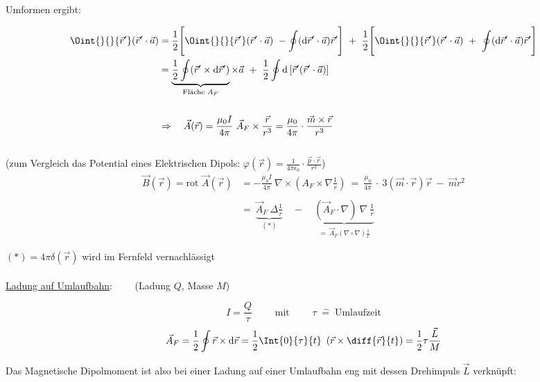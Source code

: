 Umformen ergibt:

\begin{align*}
\Oint{}{}{\vec{r}'} (\vec{r}'\cdot\vec{a}) &= \frac{1}{2}\Bigg[\Oint{}{}{\vec{r}'}(\vec{r}'\cdot\vec{a}) \ - \oint(\mathrm{d}\vec{r}'\cdot\vec{a})\vec{r}'\Bigg] \ + \ \frac{1}{2} \Bigg[\Oint{}{}{\vec{r}'}(\vec{r}'\cdot\vec{a}) \ + \ \oint(\mathrm{d}\vec{r}'\cdot\vec{a})\vec{r}'\Bigg]\\
&= \underbrace{\frac{1}{2}\oint(\vec{r}'\times\mathrm{d}\vec{r}')}_{\text{Fläche }A_F} \times\vec{a} \ + \ \frac{1}{2} \oint\mathrm{d}\left[\vec{r}'(\vec{r}'\cdot\vec{a})\right]\\ 
\ \\
& \Rightarrow \quad \vec{A}(\vec{r}) = \frac{\mu_0 I }{4\pi} \; \vec{A}_F\times\frac{\vec{r}}{r^3} = \frac{\mu_0}{4\pi} \cdot \frac{\vec{m}\times\vec{r}}{r^3}
\end{align*}
\ \\
(zum Vergleich das Potential eines Elektrischen Dipols: $\varphi(\vec{r}) = \frac{1}{4\pi\epsilon_0} \cdot \frac{\vec{p}\cdot\vec{r}}{r^3}$)
\ \\
\begin{align*}
\vec{B}(\vec{r}) = \text{rot } \vec{A}(\vec{r}) &= - \frac{\mu_0 I}{4\pi} \ \nabla \times \left(A_F\times\nabla\frac{1}{r}\right) \ = \ \frac{\mu_0}{4\pi} \ \cdot \ 3(\vec{m}\cdot\vec{r})\vec{r} \ - \ \vec{m}r^2\\
\ \\
&= \ \underbrace{\vec{A}_F \ \Delta\frac{1}{r}}_{(*)} \quad - \quad \underbrace{(\vec{A}_F
\cdot\nabla)\ \nabla \ \frac{1}{r}}_{= \ \vec{A}_F (\nabla \circ \nabla) \frac{1}{r}}
\end{align*}

$(*) = 4\pi\delta(\vec{r})$ wird im Fernfeld vernachlässigt
\ \\
\ \\
\underline{Ladung auf Umlaufbahn}:$\qquad$ (Ladung $Q$, Masse $M$)

\begin{equation*}
I = \frac{Q}{\tau} \qquad \text{ mit } \qquad \tau \; \hat{=} \; \text{Umlaufzeit}
\end{equation*}
\begin{equation*}
\vec{A}_F = \frac{1}{2}\oint\vec{r}\times\mathrm{d}\vec{r} = \frac{1}{2}\Int{0}{\tau}{t} \ \left(\vec{r}\times\diff{\vec{r}}{t}\right) =\frac{1}{2}\tau \frac{\vec{L}}{M}
\end{equation*}

Das Magnetische Dipolmoment ist also bei einer Ladung auf einer Umlaufbahn eng mit dessen Drehimpuls $\vec{L}$ verknüpft:

